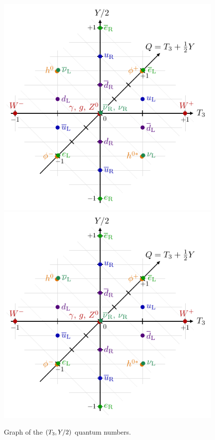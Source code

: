 \begin{figure}[p]
  \vspace*{-10mm}
  \centerline{
    \includegraphics[height=0.56\linewidth,page=5]{fig/intro/SM_isospin_weak.pdf}
    \includegraphics[height=0.56\linewidth,page=4]{fig/intro/SM_isospin_weak.pdf}
  }
  \caption{
Graph of the $(T_3,{Y}/2)$ quantum numbers.
  }\label{fig:SM_quantum_numbers_fermions}
  \vspace*{-6mm}
\end{figure}
